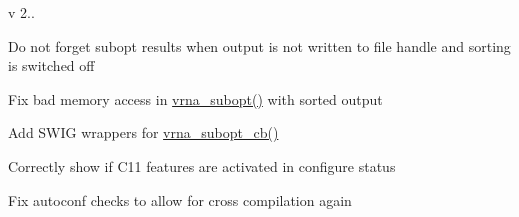 v 2..
\begin{DoxyItemize}
\item Do not \textquotesingle{}forget\textquotesingle{} subopt results when output is not written to file handle and sorting is switched off
\item Fix bad memory access in \hyperlink{group__subopt__wuchty_ga0f11d738fb8c8b1885a90c11c8931ff6}{vrna\+\_\+subopt()} with sorted output
\item Add S\+W\+IG wrappers for \hyperlink{group__subopt__wuchty_ga1053837e6b6f158093508f8a70998352}{vrna\+\_\+subopt\+\_\+cb()}
\item Correctly show if C11 features are activated in configure status
\item Fix autoconf checks to allow for cross compilation again
\end{DoxyItemize}


